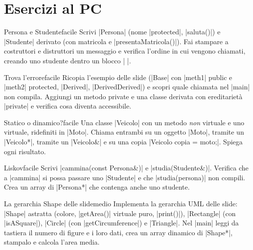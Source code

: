 \section{Esercizi al PC}

\begin{esercizio}{Persona e Studente}{facile}
Scrivi \cc|Persona| (nome \cc|protected|, \cc|saluta()|) e \cc|Studente| derivato (con
matricola e \cc|presentaMatricola()|). Fai stampare a costruttori e distruttori un
messaggio e verifica l'ordine in cui vengono chiamati, creando uno studente dentro un
blocco \cc|{ }|.
\end{esercizio}

\begin{esercizio}{Trova l'errore}{facile}
Ricopia l'esempio delle slide (\cc|Base| con \cc|meth1| public e \cc|meth2| protected,
\cc|Derived|, \cc|DerivedDerived|) e scopri quale chiamata nel \cc|main| non compila.
Aggiungi un metodo private e una classe derivata con ereditarietà \cc|private| e
verifica cosa diventa accessibile.
\end{esercizio}

\begin{esercizio}{Statico o dinamico?}{facile}
Una classe \cc|Veicolo| con un metodo \emph{non} virtuale e uno virtuale, ridefiniti in
\cc|Moto|. Chiama entrambi su un oggetto \cc|Moto|, tramite un \cc|Veicolo*|, tramite
un \cc|Veicolo&| e su una copia \cc|Veicolo copia = moto;|. Spiega ogni risultato.
\end{esercizio}

\begin{esercizio}{Liskov}{facile}
Scrivi \cc|cammina(const Persona&)| e \cc|studia(Studente&)|. Verifica che a
\cc|cammina| si possa passare uno \cc|Studente| e che \cc|studia(persona)| non compili.
Crea un array di \cc|Persona*| che contenga anche uno studente.
\end{esercizio}

\begin{esercizio}{La gerarchia Shape delle slide}{medio}
Implementa la gerarchia UML delle slide: \cc|Shape| astratta (colore, \cc|getArea()|
virtuale puro, \cc|print()|), \cc|Rectangle| (con \cc|isASquare|), \cc|Circle| (con
\cc|getCircumference|) e \cc|Triangle|. Nel \cc|main| leggi da tastiera il numero di
figure e i loro dati, crea un array dinamico di \cc|Shape*|, stampalo e calcola l'area media.
\end{esercizio}

